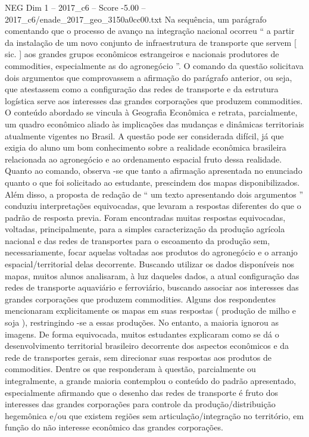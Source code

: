 \begin{textsample}{NEG Dim 1 – 2017\_c6 – Score -5.00 – 2017\_c6/enade\_2017\_geo\_3150a0cc00.txt}
Na sequência, um parágrafo comentando que o processo de avanço na integração nacional ocorreu “ a partir da instalação de um novo conjunto de infraestrutura de transporte que servem [ sic. ] aos grandes grupos econômicos estrangeiros e nacionais produtores de commodities, especialmente as do agronegócio ”.
O comando da questão solicitava dois argumentos que comprovassem a afirmação do parágrafo anterior, ou seja, que atestassem como a configuração das redes de transporte e da estrutura logística serve aos interesses das grandes corporações que produzem commodities.
O conteúdo abordado se vincula à Geografia Econômica e retrata, parcialmente, um quadro econômico aliado às implicações das mudanças e dinâmicas territoriais atualmente vigentes no Brasil.
A questão pode ser considerada difícil, já que exigia do aluno um bom conhecimento sobre a realidade econômica brasileira relacionada ao agronegócio e ao ordenamento espacial fruto dessa realidade.
Quanto ao comando, observa -se que tanto a afirmação apresentada no enunciado quanto o que foi solicitado ao estudante, prescindem dos mapas disponibilizados.
Além disso, a proposta de redação de “ um texto apresentando dois argumentos ” conduziu interpretações equivocadas, que levaram a respostas diferentes do que o padrão de resposta previa.
Foram encontradas muitas respostas equivocadas, voltadas, principalmente, para a simples caracterização da produção agrícola nacional e das redes de transportes para o escoamento da produção sem, necessariamente, focar aquelas voltadas aos produtos do agronegócio e o arranjo espacial/territorial delas decorrente.
Buscando utilizar os dados disponíveis nos mapas, muitos alunos analisaram, à luz daqueles dados, a atual configuração das redes de transporte aquaviário e ferroviário, buscando associar aos interesses das grandes corporações que produzem commodities.
Alguns dos respondentes mencionaram explicitamente os mapas em suas respostas ( produção de milho e soja ), restringindo -se a essas produções.
No entanto, a maioria ignorou as imagens.
De forma equivocada, muitos estudantes explicaram como se dá o desenvolvimento territorial brasileiro decorrente dos aspectos econômicos e da rede de transportes gerais, sem direcionar suas respostas aos produtos de commodities.
Dentre os que responderam à questão, parcialmente ou integralmente, a grande maioria contemplou o conteúdo do padrão apresentado, especialmente afirmando que o desenho das redes de transporte é fruto dos interesses das grandes corporações para controle da produção/distribuição hegemônica e/ou que existem regiões sem articulação/integração no território, em função do não interesse econômico das grandes corporações.

\end{textsample}
